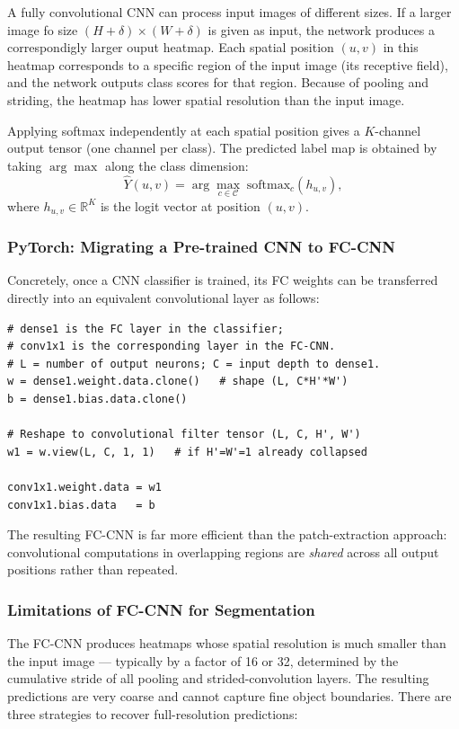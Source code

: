 \documentclass[11pt,a4paper]{article}
\begin{document}
A fully convolutional CNN can process input images of different sizes. If a larger image fo size $(H + \delta) \times (W +\delta)$ is given as input, the network produces a correspondigly larger ouput heatmap. Each spatial position $(u,v)$ in this heatmap corresponds to a specific region of the input image (its receptive field), and the network outputs class scores for that region. Because of pooling and striding, the heatmap has lower spatial resolution than the input image.

Applying softmax independently at each spatial position gives a $K$-channel output tensor (one channel per class). The predicted label map is obtained by taking $\arg\max$ along the class dimension:
\[
  \hat{Y}(u,v) = \arg\max_{c \in \mathcal{C}} \; \text{softmax}_c\!\left(h_{u,v}\right),
\]
where $h_{u,v} \in \mathbb{R}^K$ is the logit vector at position $(u,v)$.

\subsubsection{PyTorch: Migrating a Pre-trained CNN to FC-CNN}

Concretely, once a CNN classifier is trained, its FC weights can be transferred directly into an equivalent convolutional layer as follows:

\begin{lstlisting}[caption={Migrating a dense layer to a 1$\times$1 convolutional layer in PyTorch}]
# dense1 is the FC layer in the classifier;
# conv1x1 is the corresponding layer in the FC-CNN.
# L = number of output neurons; C = input depth to dense1.
w = dense1.weight.data.clone()   # shape (L, C*H'*W')
b = dense1.bias.data.clone()

# Reshape to convolutional filter tensor (L, C, H', W')
w1 = w.view(L, C, 1, 1)   # if H'=W'=1 already collapsed

conv1x1.weight.data = w1
conv1x1.bias.data   = b
\end{lstlisting}

The resulting FC-CNN is far more efficient than the patch-extraction approach: convolutional computations in overlapping regions are \emph{shared} across all output positions rather than repeated.

\subsubsection{Limitations of FC-CNN for Segmentation}

The FC-CNN produces heatmaps whose spatial resolution is much smaller than the input image — typically by a factor of 16 or 32, determined by the cumulative stride of all pooling and strided-convolution layers. The resulting predictions are very coarse and cannot capture fine object boundaries. There are three strategies to recover full-resolution predictions:
\end{document}
